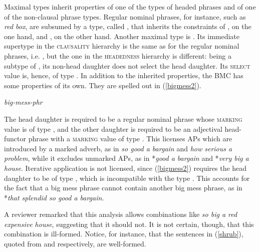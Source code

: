 \documentclass[output=paper
	        ,collection
	        ,collectionchapter
 	        ,biblatex
                ,babelshorthands
                ,newtxmath
                ,draftmode
                ,colorlinks, citecolor=brown
]{langscibook}
\begin{document}
Maximal types inherit properties of one of the types of headed phrases
and of one of the non-clausal phrase types.  
Regular nominal phrases, for instance, such as \emph{red box}, are subsumed 
by a type, called , that inherits the 
constraints of , on the one hand, and 
, on the other hand.  
Another maximal type is . 
Its immediate supertype in the \textsc{clausality} hierarchy is the same 
as for the regular nominal phrases, i.e. , 
but the one in the \textsc{headedness} hierarchy is different: 
being a subtype of , 
its non-head daughter does not select the head daughter. Its \textsc{select} 
value is, hence, of type . 
In addition to the inherited properties, the BMC has some properties of its own.   
They are spelled out in (\ref{bigmess2}).

\eas
\label{bigmess2} 
\emph{big-mess-phr} \impl \\
\zs

\noindent
The head daughter is required to be a regular nominal phrase 
whose \textsc{marking} value is of type , and the other daughter 
is required to be an adjectival head-functor phrase
with a \textsc{marking} value of type . 
This licenses APs which are introduced by a marked adverb, 
as in \emph{so good a bargain} and \emph{how serious a problem}, 
while it excludes unmarked APs, as in 
*\emph{good a bargain} and *\emph{very big a house}.
Iterative application is not licensed, since (\ref{bigmess2}) requires the 
head daughter to be of type , which is incompatible with the type 
. This accounts for the fact that a big
mess phrase cannot contain another big mess phrase, as in
*\emph{that splendid so good a bargain}.

A reviewer remarked that this analysis allows combinations like 
\emph{so big a red expensive house}, suggesting that it should not. 
It is not certain, though, that this combination is ill-formed.
Notice, for instance, that the sentences in (\ref{shrub}), 
quoted from \citet[116]{Zwicky95} and \citet[42]{Troseth09} respectively, 
are well-formed. 
\end{document}
